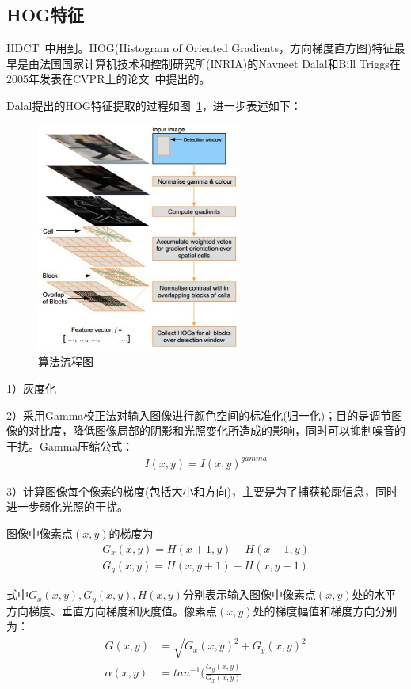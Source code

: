 \documentclass[12pt]{article}
\begin{document}
\subsection{HOG特征}

HDCT~\cite{kim2014salient}中用到。HOG(Histogram of Oriented Gradients，方向梯度直方图)特征最早是由法国国家计算机技术和控制研究所(INRIA)的Navneet Dalal和Bill Triggs在2005年发表在CVPR上的论文~\cite{dalal2005histograms}中提出的。

Dalal提出的HOG特征提取的过程如图~\ref{fig: HOG}，进一步表述如下：

\begin{figure}[!ht]
\centering
\includegraphics[width=0.6\textwidth]{HOG.png}
\caption{算法流程图}
\label{fig: HOG}
\end{figure} 

1）灰度化

2）采用Gamma校正法对输入图像进行颜色空间的标准化(归一化)；目的是调节图像的对比度，降低图像局部的阴影和光照变化所造成的影响，同时可以抑制噪音的干扰。Gamma压缩公式：
\begin{align}
I(x, y) = I(x, y)^{gamma}
\end{align}

3）计算图像每个像素的梯度(包括大小和方向)，主要是为了捕获轮廓信息，同时进一步弱化光照的干扰。

图像中像素点$(x, y)$的梯度为
\begin{align}
G_x(x, y) = H(x+1, y) - H(x-1, y) \\
G_y(x, y) = H(x, y+1) - H(x, y-1)
\end{align}

式中$G_x(x, y), G_y(x, y), H(x, y)$分别表示输入图像中像素点$(x, y)$处的水平方向梯度、垂直方向梯度和灰度值。像素点$(x, y)$处的梯度幅值和梯度方向分别为：
\begin{align}
G(x, y) & = \sqrt{G_x(x, y)^2 + G_y(x, y)^2}\\
\alpha(x, y) & = tan^{-1}(\frac{G_y(x, y)}{G_x(x, y)}
\end{align}
\end{document}
